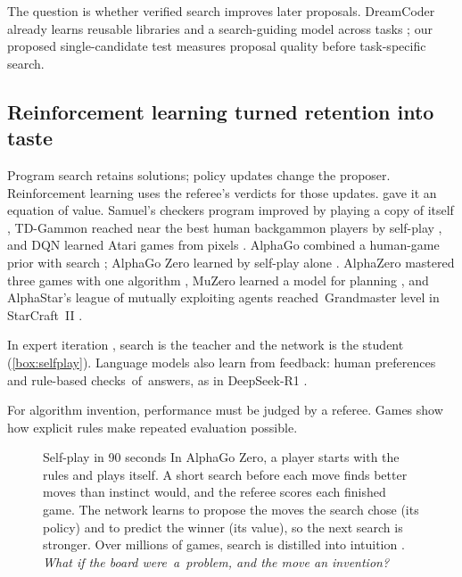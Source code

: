 The \EZ{} question is whether verified search improves later proposals.
DreamCoder \mbox{already} learns reusable libraries and a search-guiding
model across tasks \citep{ellis2021dreamcoder}; our proposed single-candidate
test measures proposal quality before task-specific search.

\subsection{Reinforcement learning turned retention into taste}\label{sub:road-rl}

Program search retains solutions; policy updates change the proposer.
Reinforcement learning uses the referee's verdicts for those updates.
\citet{bellman1957dp} gave it an equation of value. Samuel's checkers
program improved by playing a copy of itself \citep{samuel1959checkers},
TD-Gammon reached near the best human backgammon players by self-play
\citep{tesauro1995tdgammon}, and DQN learned Atari games from pixels
\citep{mnih2015dqn}. AlphaGo combined a human-game prior with search
\citep{silver2016mastering}; AlphaGo Zero learned by self-play alone
\citep{silver2017mastering}. AlphaZero mastered three games with one
algorithm \citep{silver2018general}, MuZero learned a model for planning
\citep{schrittwieser2020muzero}, and AlphaStar's league of mutually
exploiting agents \mbox{reached Grandmaster} level in StarCraft~II
\citep{vinyals2019alphastar}.

In expert iteration \citep{anthony2017expert}, search is the teacher and
the network is the student (\cref{box:selfplay}).
Language models also learn from feedback: human preferences
\citep{christiano2017preferences,ouyang2022instructgpt} and rule-based
\mbox{checks of answers,} as in DeepSeek-R1 \citep{guo2025deepseekr1}.

For algorithm invention, performance must be judged by a referee. Games
show how explicit rules make repeated evaluation possible.

\begin{figure}[tb]%
\begin{explainer}[label=box:selfplay]{Self-play in 90 seconds}
In AlphaGo Zero, a player starts with the rules and plays itself. A short
search before each move finds better moves than instinct would, and the referee
scores each finished game. The network learns to propose the moves the
search chose (its policy) and to predict the winner (its value), so the
next search is stronger. Over millions of games, search is distilled into
intuition \citep{anthony2017expert,silver2017mastering}.
\emph{What if the board \mbox{were a problem,} and the move an invention?}
\end{explainer}
\end{figure}

